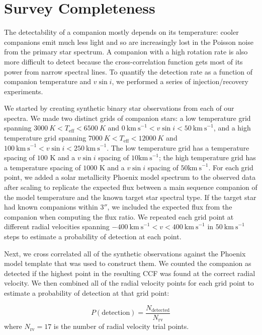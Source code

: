 \documentclass{emulateapj}
\begin{document}
\section{Survey Completeness}
\label{sec:completeness}

The detectability of a companion mostly depends on its temperature: cooler companions emit much less light and so are increasingly lost in the Poisson noise from the primary star spectrum. A companion with a high rotation rate is also more difficult to detect because the cross-correlation function gets most of its power from narrow spectral lines. To quantify the detection rate as a function of companion temperature and $v\sin{i}$, we performed a series of injection/recovery experiments. 

We started by creating synthetic binary star observations from each of our spectra. We made two distinct grids of companion stars: a low temperature grid spanning $3000\ K < T_\mathrm{eff} < 6500\ K$ and $0\ \mathrm{km\ s}^{-1} < v\sin{i} < 50\ \mathrm{km\ s}^{-1}$, and a high temperature grid spanning $7000\ K < T_\mathrm{eff} < 12000\ K$ and $100\ \mathrm{km\ s}^{-1} < v\sin{i} < 250\ \mathrm{km\ s}^{-1}$. The low temperature grid has a temperature spacing of $100$ K and a $v\sin{i}$ spacing of $10 \mathrm{km\ s}^{-1}$; the high temperature grid has a temperature spacing of $1000$ K and a $v\sin{i}$ spacing of $50 \mathrm{km\ s}^{-1}$. For each grid point, we added a solar metallicity Phoenix model spectrum to the observed data after scaling to replicate the expected flux between a main sequence companion of the model temperature and the known target star spectral type. If the target star had known companions within $3''$, we included the expected flux from the companion when computing the flux ratio. We repeated each grid point at different radial velocities spanning $-400\ \mathrm{km\ s}^{-1} < v < 400\ \mathrm{km\ s}^{-1}$ in $50\ \mathrm{km\ s}^{-1}$ steps to estimate a probability of detection at each point.

Next, we cross correlated all of the synthetic observations against the Phoenix model template that was used to construct them. We counted the companion as detected if the highest point in the resulting CCF was found at the correct radial velocity. We then combined all of the radial velocity points for each grid point to estimate a probability of detection at that grid point:

\begin{equation}
P(\mathrm{detection}) = \frac{N_\mathrm{detected}}{N_\mathrm{rv}}
\end{equation}
where $N_\mathrm{rv} = 17$ is the number of radial velocity trial points. 
\end{document}

